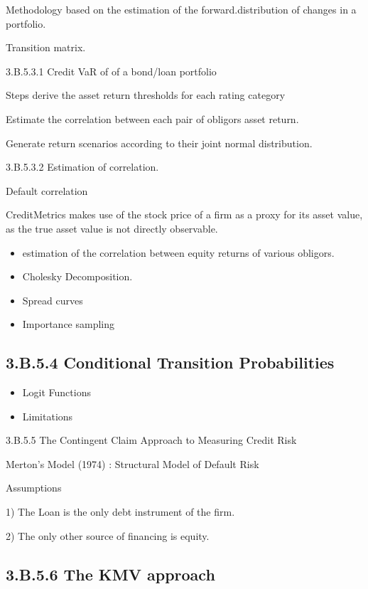 Methodology based on the estimation of the forward.distribution of changes in a portfolio.

Transition matrix. 



3.B.5.3.1 Credit VaR of of a bond/loan portfolio

Steps derive the asset return thresholds for each rating category

Estimate the correlation between each pair of obligors asset return.

Generate return scenarios according to their joint normal distribution.


3.B.5.3.2 Estimation of correlation.


Default correlation


CreditMetrics makes use of the stock price of a firm as a proxy for its asset value, as the true asset value is not directly observable.

\begin{itemize}
\item estimation of the correlation between equity returns of various obligors.
\item Cholesky Decomposition.
\item Spread curves
\item Importance sampling
\end{itemize}
\subsection{3.B.5.4 Conditional Transition Probabilities}
\begin{itemize}
\item Logit Functions
\item Limitations
\end{itemize}
3.B.5.5 The Contingent Claim Approach to Measuring Credit Risk

Merton’s Model (1974) : Structural Model of Default Risk


Assumptions

1) The Loan is the only debt instrument of the firm.

2) The only other source of financing is equity.

\subsection{3.B.5.6 The KMV approach}

